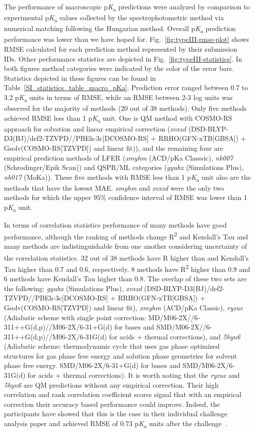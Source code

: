 \documentclass[9pt,lineno,final]{elife}
\newcommand{\pKa}{p\textit{K}\textsubscript{a}}
\begin{document}
The performance of macroscopic \pKa{} predictions were analyzed by comparison to experimental \pKa{} values collected by the spectrophotometric method via numerical matching following the Hungarian method.  
Overall \pKa{} prediction performance was lower than we have hoped for. 
Fig.~\ref{fig:typeIII-rmse-plot} shows RMSE calculated for each prediction method represented by their submission IDs. 
Other performance statistics are depicted in Fig.~\ref{fig:typeIII-statistics}.
In both figures method categories were indicated by the color of the error bars.  Statistics depicted in these figures can be found in Table~\ref{SI_statistics_table_macro_pKa}.
Prediction error ranged between 0.7 to 3.2 \pKa{} units in terms of RMSE, while an RMSE between 2-3 log units was observed for the majority of methods (20 out of 38 methods). 
Only five methods achieved RMSE less than 1 \pKa{} unit. One is QM method with COSMO-RS approach for solvation and linear empirical correction (\textit{xvxzd} (DSD-BLYP-D3(BJ)/def2-TZVPD//PBEh-3c[DCOSMO-RS] + RRHO(GFN-xTB[GBSA]) + Gsolv(COSMO-RS[TZVPD]) and linear fit)), and the remaining four are empirical prediction methods of LFER (\textit{xmyhm} (ACD/pKa Classsic), \textit{nb007} (Schrodinger/Epik Scan)) and QSPR/ML categories (\textit{gyuhx} (Simulations Plus), \textit{nb017} (MoKa)). 
These five methods with RMSE less than 1 \pKa{} unit also are the methods that have the lowest MAE.
\textit{xmyhm} and \textit{xvxzd} were the only two methods for which the upper 95\% confidence interval of RMSE was lower than 1 \pKa{} unit. 

In terms of correlation statistics performance of many methods have good performance, although the ranking of methods change R\textsuperscript{2} and Kendall's Tau and many methods are indistinguishable from one another considering uncertainty of the correlation statistics. 
32 out of 38 methods have R\textsuperscript{} higher than and Kendall's Tau higher than 0.7 and 0.6, respectively.
8 methods have R\textsuperscript{2} higher than 0.9 and 6 methods have Kendall's Tau higher than 0.8.
The overlap of these two sets are the following:
\textit{gyuhx} (Simulations Plus), \textit{xvxzd} (DSD-BLYP-D3(BJ)/def2-TZVPD//PBEh-3c[DCOSMO-RS] + RRHO(GFN-xTB[GBSA]) + Gsolv(COSMO-RS[TZVPD]) and linear fit), \textit{xmyhm} (ACD/pKa Classic), \textit{ryzue} (Adiabatic scheme with single point correction: MD/M06-2X//6-311++G(d,p)//M06-2X/6-31+G(d) for bases and SMD/M06-2X//6-311++G(d,p)//M06-2X/6-31G(d) for acids + thermal corrections), and \textit{5byn6} 
(Adiabatic scheme: thermodynamic cycle that uses gas phase optimized structures for gas phase free energy and solution phase geometries for solvent phase free energy. SMD/M06-2X/6-31+G(d) for bases and SMD/M06-2X/6-31G(d) for acids + thermal corrections).
It is worth noting that the \textit{ryzue} and \textit{5byn6} are QM predictions without any empirical correction. Their high correlation and rank correlation coefficient scores signal that with an empirical correction their accuracy based performance could improve. Indeed, the participants have showed that this is the case in their individual challenge analysis paper and achieved RMSE of 0.73 \pKa{} units after the challenge~\citep{Zeng:2018:J.Comput.AidedMol.Des.}. 
\end{document}
